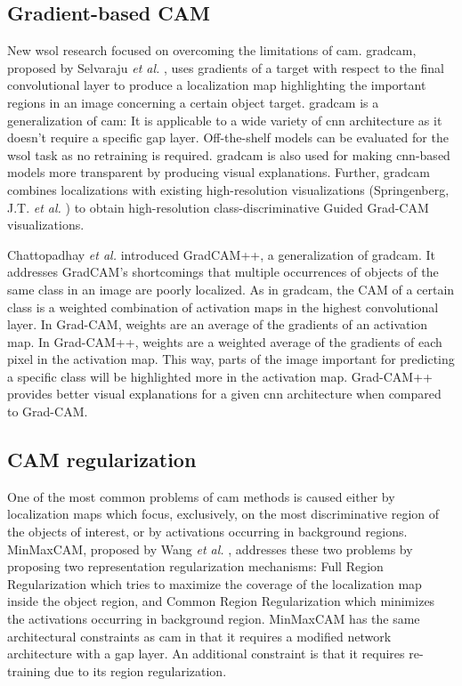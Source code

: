 \subsection{Gradient-based CAM}
New \acrshort{wsol} research focused on overcoming the limitations of \acrshort{cam}. \acrfull{gradcam}, proposed by Selvaraju \textit{et al.} \cite{selvaraju2017grad}, uses gradients of a target with respect to the final convolutional layer to produce a localization map highlighting the important regions in an image concerning a certain object target. \acrshort{gradcam} is a generalization of \acrshort{cam}: It is applicable to a wide variety of \acrshort{cnn} architecture as it doesn't require a specific \acrshort{gap} layer. Off-the-shelf models can be evaluated for the \acrshort{wsol} task as no retraining is required. \acrshort{gradcam} is also used for making \acrshort{cnn}-based models more transparent by producing visual explanations. Further, \acrshort{gradcam} combines localizations with existing high-resolution visualizations (Springenberg, J.T. \textit{et al.} \cite{springenberg2014striving}) to obtain high-resolution class-discriminative Guided Grad-CAM visualizations.

Chattopadhay \textit{et al.} \cite{chattopadhay2018grad} introduced GradCAM++, a generalization of \acrshort{gradcam}. It addresses GradCAM's shortcomings that multiple occurrences of objects of the same class in an image are poorly localized. As in \acrshort{gradcam}, the CAM of a certain class is a weighted combination of activation maps in the highest convolutional layer. In Grad-CAM, weights are an average of the gradients of an activation map. In Grad-CAM++, weights are a weighted average of the gradients of each pixel in the activation map. This way, parts of the image important for predicting a specific class will be highlighted more in the activation map. Grad-CAM++ provides better visual explanations for a given \acrshort{cnn} architecture when compared to Grad-CAM.

\subsection{CAM regularization}
One of the most common problems of \acrshort{cam} methods is caused either by localization maps which focus, exclusively, on the most discriminative region of the objects of interest, or by activations occurring in background regions. MinMaxCAM, proposed by Wang \textit{et al.} \cite{wang2021minmaxcam}, addresses these two problems by proposing two representation regularization mechanisms: Full Region Regularization which tries to maximize the coverage of the localization map inside the object region, and Common Region Regularization which minimizes the activations occurring in background region. MinMaxCAM has the same architectural constraints as \acrshort{cam} in that it requires a modified network architecture with a \acrshort{gap} layer. An additional constraint is that it requires re-training due to its region regularization.

